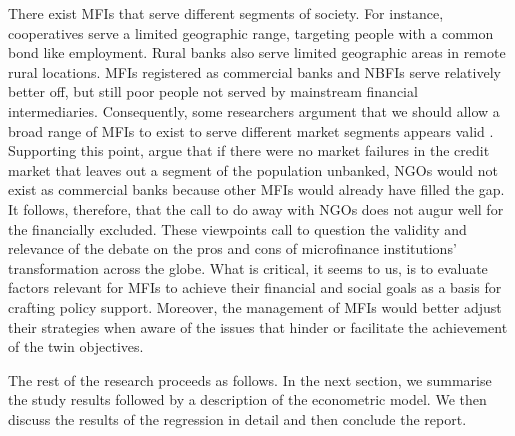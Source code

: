 \documentclass[a4paper, nobind]{templates/ociamthesis}
\begin{document}
There exist MFIs that serve different segments of society. For instance, cooperatives serve a limited geographic range, targeting people with a common bond like employment. Rural banks also serve limited geographic areas in remote rural locations. MFIs registered as commercial banks and NBFIs serve relatively better off, but still poor people not served by mainstream financial intermediaries. Consequently, some researchers argument that we should allow a broad range of MFIs to exist to serve different market segments appears valid \autocites[by][]{morduch1999microfinance,morduch2000microfinance}. Supporting this point, \textcite{morduch2019challenges} argue that if there were no market failures in the credit market that leaves out a segment of the population unbanked, NGOs would not exist as commercial banks because other MFIs would already have filled the gap. It follows, therefore, that the call to do away with NGOs does not augur well for the financially excluded. These viewpoints call to question the validity and relevance of the debate on the pros and cons of microfinance institutions' transformation across the globe. What is critical, it seems to us, is to evaluate factors relevant for MFIs to achieve their financial and social goals as a basis for crafting policy support. Moreover, the management of MFIs would better adjust their strategies when aware of the issues that hinder or facilitate the achievement of the twin objectives.

The rest of the research proceeds as follows. In the next section, we summarise the study results followed by a description of the econometric model. We then discuss the results of the regression in detail and then conclude the report.
\end{document}
